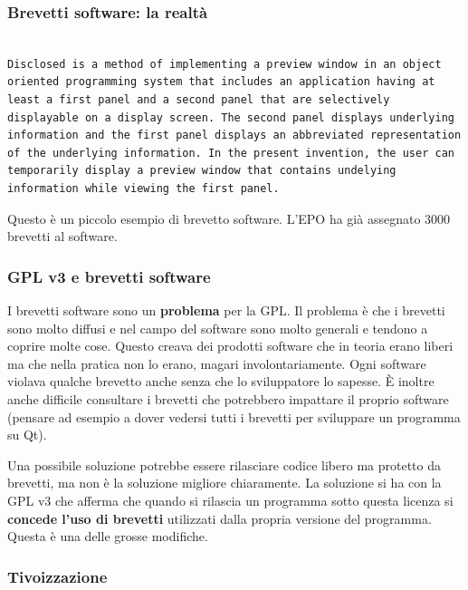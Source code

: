 \subsubsection{Brevetti software: la realtà}

\begin{lstlisting}

Disclosed is a method of implementing a preview window in an object oriented programming system that includes an application having at least a first panel and a second panel that are selectively displayable on a display screen. The second panel displays underlying information and the first panel displays an abbreviated representation of the underlying information. In the present invention, the user can temporarily display a preview window that contains undelying information while viewing the first panel.

\end{lstlisting}

Questo è un piccolo esempio di brevetto software. L'EPO ha già assegnato 3000 brevetti al software.

\subsubsection{GPL v3 e brevetti software}

I brevetti software sono un \textbf{problema} per la GPL. Il problema è che i brevetti sono molto diffusi e nel campo del software sono molto generali e tendono a coprire molte cose. Questo creava dei prodotti software che in teoria erano liberi ma che nella pratica non lo erano, magari involontariamente. Ogni software violava qualche brevetto anche senza che lo sviluppatore lo sapesse. È inoltre anche difficile consultare i brevetti che potrebbero impattare il proprio software (pensare ad esempio a dover vedersi tutti i brevetti per sviluppare un programma su Qt).

Una possibile soluzione potrebbe essere rilasciare codice libero ma protetto da brevetti, ma non è la soluzione migliore chiaramente. La soluzione si ha con la GPL v3 che afferma che quando si rilascia un programma sotto questa licenza si \textbf{concede l'uso di brevetti} utilizzati dalla propria versione del programma. Questa è una delle grosse modifiche.

\subsubsection{Tivoizzazione}

